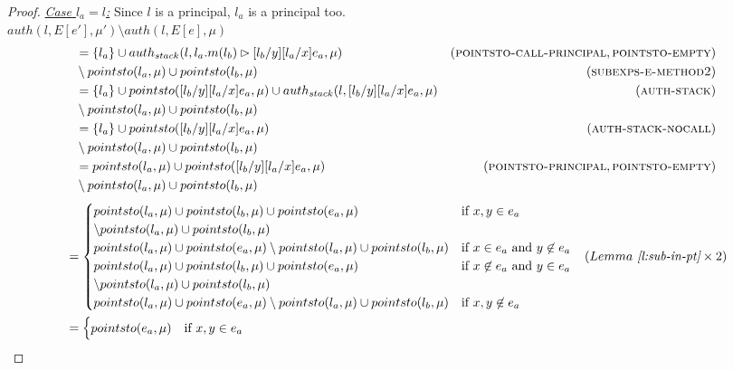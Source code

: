 \documentclass{llncs}
\begin{document}
\begin{proof}
\noindent\underline{\textit{Case $l_a = l$:}} Since $l$ is a principal, $l_a$ is a principal too.\\
$auth(l, E[e'], \mu') \setminus auth(l, E[e], \mu)$
\vspace{-7pt}
\begin{align*}
&= \{ l_a \} \cup auth_{stack}(l, l_a.m(l_b) \rhd [l_b / y][l_a / x]e_a, \mu) & (\textsc{pointsto-call-principal}, \textsc{pointsto-empty})\\
&\setminus pointsto(l_a, \mu) \cup pointsto(l_b, \mu) & (\textsc{subexps-e-method2})\\
&= \{ l_a \} \cup pointsto([l_b / y][l_a / x]e_a, \mu) \cup auth_{stack}(l, [l_b / y][l_a / x]e_a, \mu) & (\textsc{auth-stack})\\
&\setminus pointsto(l_a, \mu) \cup pointsto(l_b, \mu)\\
&= \{ l_a \} \cup pointsto([l_b / y][l_a / x]e_a, \mu) & (\textsc{auth-stack-nocall})\\
&\setminus pointsto(l_a, \mu) \cup pointsto(l_b, \mu)\\
&= pointsto(l_a, \mu) \cup pointsto([l_b / y][l_a / x]e_a, \mu) & (\textsc{pointsto-principal}, \textsc{pointsto-empty})\\
&\setminus pointsto(l_a, \mu) \cup pointsto(l_b, \mu)
\end{align*}
\vspace{-25pt}
\begin{align*}
&=
\begin{cases}
    pointsto(l_a, \mu) \cup pointsto(l_b, \mu) \cup pointsto(e_a, \mu) & \text{if } x, y \in e_a\\
    \setminus pointsto(l_a, \mu) \cup pointsto(l_b, \mu)\\
    pointsto(l_a, \mu) \cup pointsto(e_a, \mu) \setminus pointsto(l_a, \mu) \cup pointsto(l_b, \mu) & \text{if } x \in e_a\text{ and } y \not\in e_a\\
    pointsto(l_a, \mu) \cup pointsto(l_b, \mu) \cup pointsto(e_a, \mu) & \text{if } x \not\in e_a \text{ and } y \in e_a\\
    \setminus pointsto(l_a, \mu) \cup pointsto(l_b, \mu)\\
    pointsto(l_a, \mu) \cup pointsto(e_a, \mu) \setminus pointsto(l_a, \mu) \cup pointsto(l_b, \mu) & \text{if } x, y \not\in e_a
\end{cases} & (Lemma~\textit{\ref{l:sub-in-pt}} \times 2)\\
&=
\begin{cases}
    pointsto(e_a, \mu) & \text{if } x, y \in e_a\\

\end{cases}
\end{align*}
\end{proof}
\end{document}
